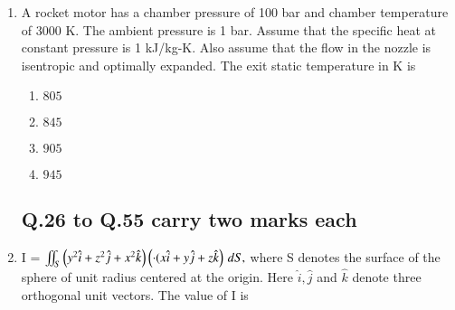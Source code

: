 \documentclass[journal,12pt,onecolumn]{IEEEtran}
\theoremstyle{remark}
\begin{document}
\begin{enumerate}
\begin{enumerate}
    \end{enumerate}


    \item A rocket motor has a chamber pressure of 100 bar and chamber temperature of 3000 K. The ambient pressure is 1 bar. Assume that the specific heat at constant pressure is 1 kJ/kg-K. Also assume that the flow in the nozzle is isentropic and optimally expanded. The exit static temperature in K is 

    \begin{enumerate}
        \item $805$
        \item $845$
        \item $905$
        \item $945$
    \end{enumerate}

    \subsection*{Q.26 to Q.55 carry two marks each}

    \item I = $\iint_S \left( y^2 \hat{i} + z^2 \hat{j} + x^2 \hat{k} \right)\left( \cdot ( x \hat{i} + y \hat{j} + z \hat{k}\right) \, dS,$  where S denotes the surface of the sphere of unit radius centered at the origin. Here $\hat{i}, \hat{j}$ and $\hat{k}$  denote three orthogonal unit vectors. The value of I is \underline{\hspace{2cm}}



    
\end{enumerate}
\end{document}

